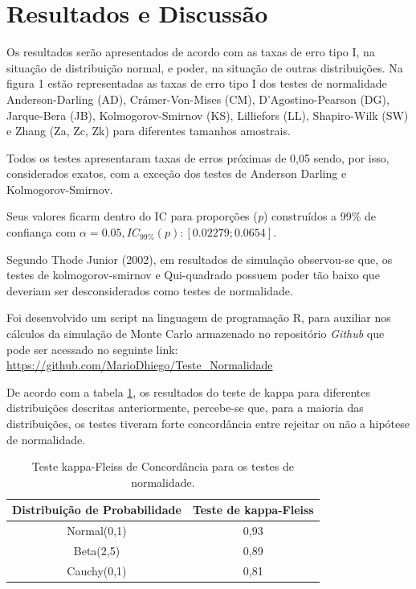 \documentclass[a4paper,11pt]{article} %
\begin{document}


\newpage
\section{Resultados e Discussão}
Os resultados serão apresentados de acordo com as taxas de erro tipo I, na situação de distribuição normal, e poder, na situação de outras distribuições. Na figura 1 estão representadas as taxas de erro tipo I dos testes de normalidade Anderson-Darling (AD), Crámer-Von-Mises (CM), D’Agostino-Pearson (DG), Jarque-Bera (JB), Kolmogorov-Smirnov (KS), Lilliefors (LL), Shapiro-Wilk (SW) e Zhang (Za, Zc, Zk) para diferentes tamanhos amostrais. \vskip0.3cm

Todos os testes apresentaram taxas de erros próximas de 0,05 sendo, por isso, considerados exatos, com a exceção dos testes de Anderson Darling e Kolmogorov-Smirnov. \vskip0.3cm

Seus valores ficarm dentro do IC para proporções (\textit{p}) construídos a 99\% de confiança com $\alpha = 0.05, IC_{99\%}(p): [0.02279;0.0654].$
\vskip0.3cm

Segundo Thode Junior (2002), em resultados de simulação observou-se que, os testes de kolmogorov-smirnov e Qui-quadrado possuem poder tão baixo que deveriam ser desconsiderados como testes de normalidade.\vskip0.3cm

Foi desenvolvido um script na linguagem de programação R, para auxiliar nos cálculos da simulação de Monte Carlo armazenado no repositório \textit{Github} que pode ser acessado no seguinte link: \href{https://github.com/MarioDhiego/Teste\_Normalidade}{https://github.com/MarioDhiego/Teste\_Normalidade}

\vskip0.3cm


De acordo com a tabela \ref{tab:my_label1}, os resultados do teste de kappa para diferentes distribuições descritas anteriormente, percebe-se que, para a maioria das distribuições, os testes tiveram forte concordância entre rejeitar ou não a hipótese de normalidade. 



\begin{table}[H]
\centering
 \begin{tabular}{c|c}
\hline \hline
Distribuição de Probabilidade  &  Teste de kappa-Fleiss\\
\hline
      Normal(0,1)              &  0,93  \\
      Beta(2,5)                &  0,89  \\
      Cauchy(0,1)              &  0,81  \\
\hline \hline
    \end{tabular}
    \caption{Teste kappa-Fleiss de Concordância para os testes de normalidade.}
    \label{tab:my_label1}
\end{table}
\end{document}
